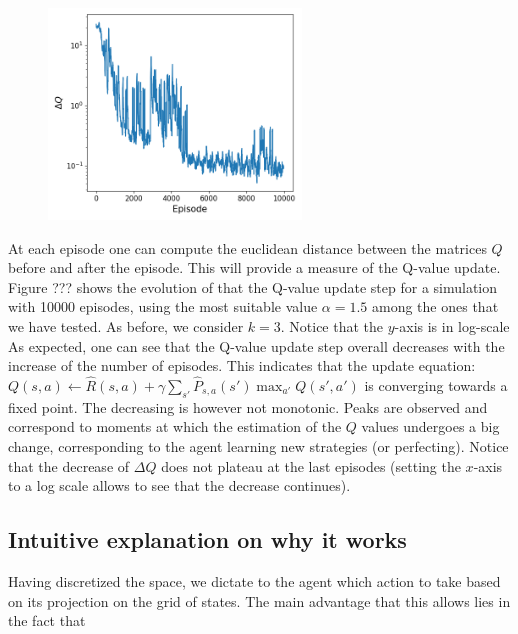 \documentclass[a4paper, 12pt,oneside]{article}
\begin{document}
       
        \begin{figure}
            \centering
            \vspace{-1em}
            \includegraphics[width=0.6\textwidth]{../runs/dyna/dyna-k=3-ss_coef=1.5_eps=10000/figs/log_Q_value_changes.png}
            \caption{}
        \end{figure}

        At each episode one can compute the euclidean distance between the matrices $Q$ before and after the episode. This will provide a measure of the Q-value update. Figure ??? shows the evolution of that the Q-value update step for a simulation with 10000 episodes, using the most suitable value $\alpha=1.5$ among the ones that we have tested. As before, we consider $k=3$. Notice that the $y$-axis is in log-scale
        As expected, one can see that the Q-value update step overall decreases with the increase of the number of episodes. This indicates that the update equation: $Q(s,a) \leftarrow \hat{R}(s,a) + \gamma \sum_{s'} \hat{P}_{s,a}(s') \max_{a'}Q(s',a')$ is converging towards a fixed point. The decreasing is however not monotonic. Peaks are observed and correspond to moments at which the estimation of the $Q$ values undergoes a big change, corresponding to the agent learning new strategies (or perfecting). Notice that the decrease of $\Delta Q$ does not plateau at the last episodes (setting the $x$-axis to a log scale allows to see that the decrease continues).
        

        

        \subsection{Intuitive explanation on why it works}
        Having discretized the space, we dictate to the agent which action to take based on its projection on the grid of states. 
        The main advantage that this allows lies in the fact that 
\end{document}
